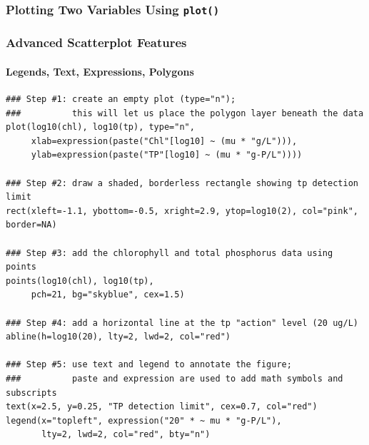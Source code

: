 \documentclass[10pt]{beamer}
\begin{document}
\begin{frame}[fragile]
\frametitle{Plotting Two Variables Using {\color{red} \tt plot()}}
\vspace*{-3ex}
\begin{center}
\end{center}
\end{frame}


\begin{frame}[fragile]
\frametitle{Advanced Scatterplot Features}
\framesubtitle{Legends, Text, Expressions, Polygons}
\label{advancedscatterplots}
{\color{red} \scriptsize

\begin{verbatim}
### Step #1: create an empty plot (type="n"); 
###          this will let us place the polygon layer beneath the data
plot(log10(chl), log10(tp), type="n",
     xlab=expression(paste("Chl"[log10] ~ (mu * "g/L"))),
     ylab=expression(paste("TP"[log10] ~ (mu * "g-P/L"))))

### Step #2: draw a shaded, borderless rectangle showing tp detection limit
rect(xleft=-1.1, ybottom=-0.5, xright=2.9, ytop=log10(2), col="pink", border=NA)

### Step #3: add the chlorophyll and total phosphorus data using points
points(log10(chl), log10(tp),
     pch=21, bg="skyblue", cex=1.5)

### Step #4: add a horizontal line at the tp "action" level (20 ug/L)
abline(h=log10(20), lty=2, lwd=2, col="red")

### Step #5: use text and legend to annotate the figure;
###          paste and expression are used to add math symbols and subscripts
text(x=2.5, y=0.25, "TP detection limit", cex=0.7, col="red")
legend(x="topleft", expression("20" * ~ mu * "g-P/L"),
       lty=2, lwd=2, col="red", bty="n")
\end{verbatim}
}
\end{frame}
\end{document}
